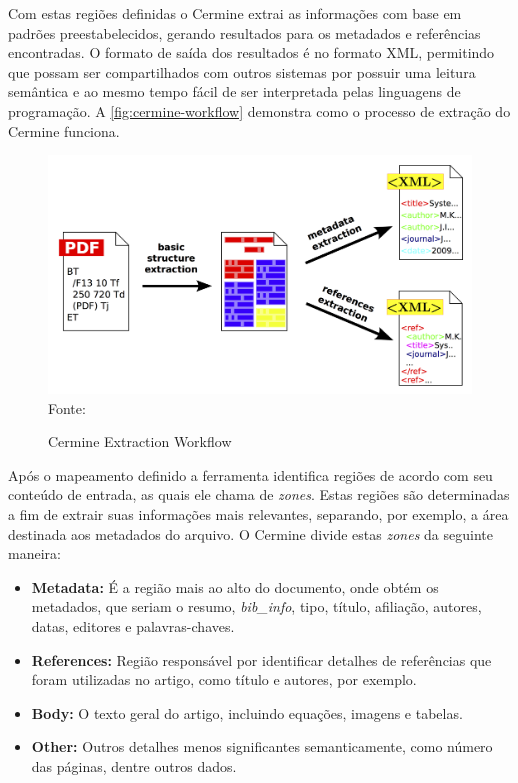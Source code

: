 Com estas regiões definidas o Cermine extrai as informações com base em padrões preestabelecidos, gerando resultados para os metadados e referências encontradas. O formato de saída dos resultados é no formato XML, permitindo que possam ser compartilhados com outros sistemas por possuir uma leitura semântica e ao mesmo tempo fácil de ser interpretada pelas linguagens de programação. A \autoref{fig:cermine-workflow} demonstra como o processo de extração do Cermine funciona.

\begin{figure}
    \centering
    \caption{Cermine Extraction Workflow}
    \label{fig:cermine-workflow}
    \includegraphics[width=0.7\linewidth]{./assets/images/cermine}
    \center\footnotesize{Fonte: \cite{cermine}}
\end{figure}

Após o mapeamento definido a ferramenta identifica regiões de acordo com seu conteúdo de entrada, as quais ele chama de \textit{zones}. Estas regiões são determinadas a fim de extrair suas informações mais relevantes, separando, por exemplo, a área destinada aos metadados do arquivo. O Cermine divide estas \textit{zones} da seguinte maneira:

\begin{itemize}

    \item \textbf{Metadata:} É a região mais ao alto do documento, onde obtém os metadados, que seriam o resumo, \textit{bib\_info}, tipo, título, afiliação, autores, datas, editores e palavras-chaves.

    \item \textbf{References:} Região responsável por identificar detalhes de referências que foram utilizadas no artigo, como título e autores, por exemplo.

    \item \textbf{Body:} O texto geral do artigo, incluindo equações, imagens e tabelas.

    \item \textbf{Other:} Outros detalhes menos significantes semanticamente, como número das páginas, dentre outros dados.

\end{itemize}

